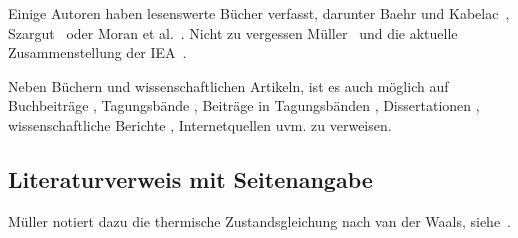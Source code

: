Einige Autoren haben lesenswerte Bücher verfasst, darunter Baehr und Kabelac~\cite{baehr2012}, Szargut~\cite{szargut2007} oder Moran et al.~\cite{moran2014}. Nicht zu vergessen Müller~\cite{mueller2001} und die aktuelle Zusammenstellung der IEA~\cite{weo2016}.

Neben Büchern und wissenschaftlichen Artikeln, ist es auch möglich auf Buchbeiträge \cite{lojewski_urban1989}, Tagungsbände \cite{spliethoff2010a}, Beiträge in Tagungsbänden \cite{fraas1974,fraas1975}, Dissertationen \cite{ruegg1945,gaggioli1961}, wissenschaftliche Berichte \cite{gutstein1975,nas_3_10606_1968}, Internetquellen uvm. zu verweisen.

\subsection{Literaturverweis mit Seitenangabe}

Müller notiert dazu die thermische Zustandsgleichung nach van der Waals, siehe~\cite[S.~100]{mueller2001}.










